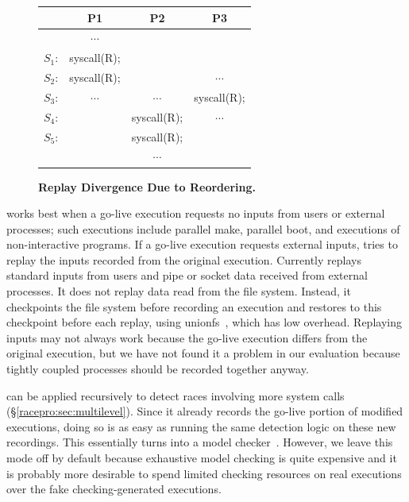 \begin{figure}[t]
  \centering
  \begin{minipage}{.55\linewidth}
    \begin{rbox}
      \centering
      \begin{tabular}{lccc}
               & {\bf P1}    & {\bf P2}    & {\bf P3}    \\ \hline
               & $\cdots$    &             &             \\
        $S_1$: & syscall(R); &             &             \\
        $S_2$: & syscall(R); &             & $\cdots$    \\
        $S_3$: & $\cdots$    & $\cdots$    & syscall(R); \\
        $S_4$: &             & syscall(R); & $\cdots$    \\
        $S_5$: &             & syscall(R); &             \\
               &             & $\cdots$    &             \\
      \end{tabular}
    \end{rbox}
  \end{minipage}
  \caption{{\bf Replay Divergence Due to Reordering.}}
  \label{racepro:fig:reorder}
\end{figure}

\racepro works best when a go-live execution requests no inputs from users or
external processes; such executions include parallel make, parallel boot,
and executions of non-interactive programs.  If a go-live execution
requests external inputs, \racepro tries to replay the inputs recorded from
the original execution.  Currently \racepro replays standard inputs from users
and pipe or socket data received from external processes.  It does not
replay data read from the file system.  Instead, it checkpoints the file
system before recording an execution and restores to this checkpoint
before each replay, using unionfs~\cite{unionfs}, which has
low overhead.  Replaying inputs may not
always work because the go-live execution differs from the original
execution, but we have not found it a problem in our evaluation because
tightly coupled processes should be recorded together anyway.

\racepro can be applied recursively to detect races involving more system
calls (\S\ref{racepro:sec:multilevel}). Since it already records the go-live
portion of modified executions, doing so is as easy as running the
same detection logic on these new recordings. This essentially turns
\racepro into a model checker~\cite{flanagan:dynamicpo}. However, we leave
this mode off by default because exhaustive model checking is quite
expensive and it is probably more desirable to spend limited checking
resources on real executions over the fake checking-generated
executions.

